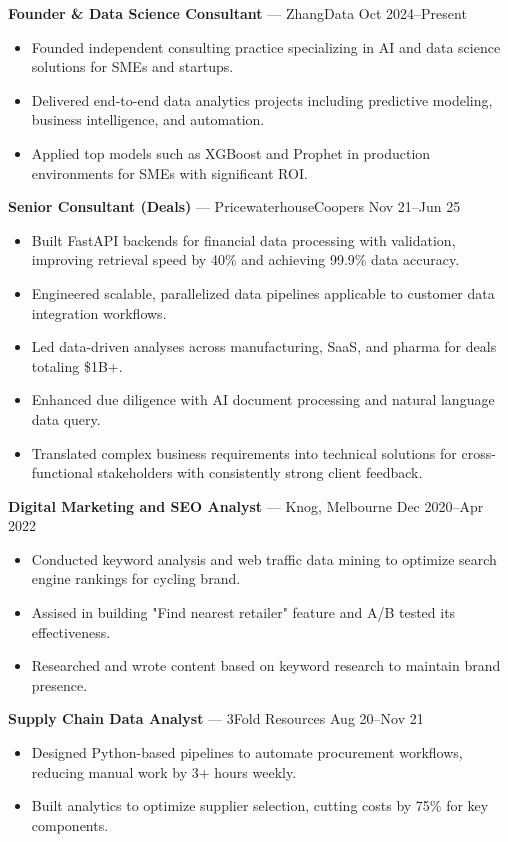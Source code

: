 \documentclass[10pt,letterpaper]{article}
\begin{document}
\textbf{Founder \& Data Science Consultant} — ZhangData \hfill Oct 2024--Present\\[-1.5em]
\begin{itemize}
  \item Founded independent consulting practice specializing in AI and data science solutions for SMEs and startups.
  \item Delivered end-to-end data analytics projects including predictive modeling, business intelligence, and automation.
  \item Applied top models such as XGBoost and Prophet in production environments for SMEs with significant ROI.
\end{itemize}

\textbf{Senior Consultant (Deals)} — PricewaterhouseCoopers \hfill Nov 21--Jun 25\\[-1.5em]
\begin{itemize}
  \item Built FastAPI backends for financial data processing with validation, improving retrieval speed by 40\% and achieving 99.9\% data accuracy.
  \item Engineered scalable, parallelized data pipelines applicable to customer data integration workflows.
  \item Led data-driven analyses across manufacturing, SaaS, and pharma for deals totaling \$1B+.
  \item Enhanced due diligence with AI document processing and natural language data query.
  \item Translated complex business requirements into technical solutions for cross-functional stakeholders with consistently strong client feedback.
\end{itemize}

\textbf{Digital Marketing and SEO Analyst} — Knog, Melbourne \hfill Dec 2020--Apr 2022\\[-1.5em]
\begin{itemize}
  \item Conducted keyword analysis and web traffic data mining to optimize search engine rankings for cycling brand.
  \item Assised in building "Find nearest retailer" feature and A/B tested its effectiveness.
  \item Researched and wrote content based on keyword research to maintain brand presence.
\end{itemize}

\textbf{Supply Chain Data Analyst} — 3Fold Resources \hfill Aug 20--Nov 21\\[-1.5em]
\begin{itemize}
  \item Designed Python-based pipelines to automate procurement workflows, reducing manual work by 3+ hours weekly.
  \item Built analytics to optimize supplier selection, cutting costs by 75\% for key components.
\end{itemize}
\end{document}
